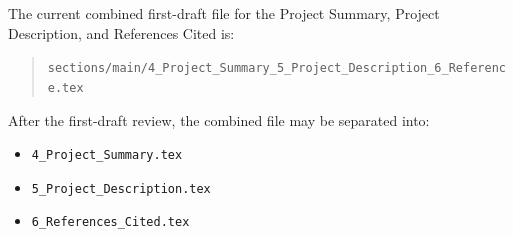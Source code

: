 \documentclass[11pt,letterpaper]{article}
\begin{document}
\medskip

\noindent
The current combined first-draft file for the Project Summary, Project
Description, and References Cited is:

\begin{quote}
\texttt{sections/main/4\_Project\_Summary\_5\_Project\_Description\_6\_Reference.tex}
\end{quote}

After the first-draft review, the combined file may be separated into:

\begin{itemize}[leftmargin=0.25in]
    \item \texttt{4\_Project\_Summary.tex}
    \item \texttt{5\_Project\_Description.tex}
    \item \texttt{6\_References\_Cited.tex}
\end{itemize}
\end{document}
